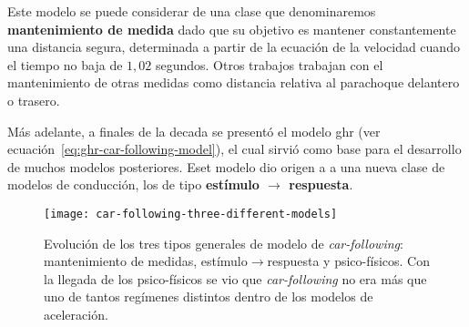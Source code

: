 Este modelo se puede considerar de una clase que denominaremos \textbf{mantenimiento de medida} dado que su objetivo es mantener constantemente una distancia segura, determinada a partir de la ecuación de la velocidad cuando el tiempo no baja de $1,02$ segundos. Otros trabajos trabajan con el mantenimiento de otras medidas como distancia relativa al parachoque delantero o trasero.


Más adelante, a finales de la decada se presentó el modelo \gls{ghr} (ver ecuación~\ref{eq:ghr-car-following-model}), el cual sirvió como base para el desarrollo de muchos modelos posteriores. Eset modelo dio origen a a una nueva clase de modelos de conducción, los de tipo \textbf{estímulo $\rightarrow$ respuesta}. 

\begin{figure}[t]
	\centering
	\texttt{[image: car-following-three-different-models]}
	\caption[Evolución de los tres tipos generales de modelo de \textit{car-following}]{Evolución de los tres tipos generales de modelo de \textit{car-following}: mantenimiento de medidas, estímulo$\rightarrow$respuesta y psico-físicos. Con la llegada de los psico-físicos se vio que \textit{car-following} no era más que uno de tantos regímenes distintos dentro de los modelos de aceleración.}
	\label{fig:car-following-three-different-models}
\end{figure}

